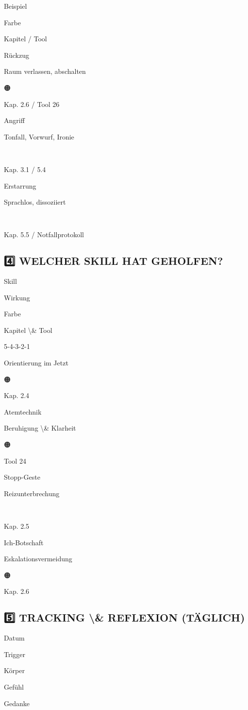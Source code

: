 Beispiel

Farbe

Kapitel / Tool

Rückzug

Raum verlassen, abschalten

🟠

Kap. 2.6 / Tool 26

Angriff

Tonfall, Vorwurf, Ironie

🔴

Kap. 3.1 / 5.4

Erstarrung

Sprachlos, dissoziiert

🔴

Kap. 5.5 / Notfallprotokoll

\subsection{4️⃣ WELCHER SKILL HAT GEHOLFEN?}

Skill

Wirkung

Farbe

Kapitel \textbackslash{}& Tool

5-4-3-2-1

Orientierung im Jetzt

🟠

Kap. 2.4

Atemtechnik

Beruhigung \textbackslash{}& Klarheit

🟠

Tool 24

Stopp-Geste

Reizunterbrechung

🔴

Kap. 2.5

Ich-Botschaft

Eskalationsvermeidung

🟠

Kap. 2.6

\subsection{5️⃣ TRACKING \textbackslash{}& REFLEXION (TÄGLICH)}

Datum

Trigger

Körper

Gefühl

Gedanke

